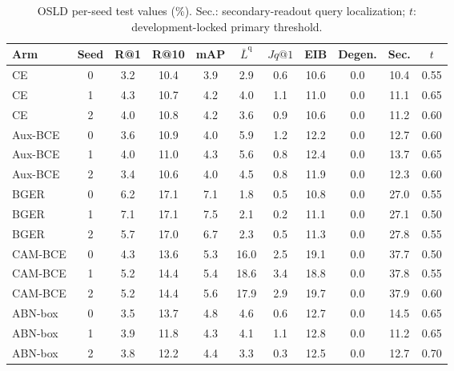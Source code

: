 \begin{table}[t]
\centering\footnotesize
\caption{OSLD per-seed test values (\%). Sec.: secondary-readout query localization; $t$: development-locked primary threshold.}
\label{tab:osld-perseed}
\begin{tabular}{lcccccccccc}
\toprule
Arm & Seed & R@1 & R@10 & mAP & $\bar L^{\mathrm q}$ & $Jq@1$ & EIB & Degen. & Sec. & $t$\\
\midrule
CE & 0 & 3.2 & 10.4 & 3.9 & 2.9 & 0.6 & 10.6 & 0.0 & 10.4 & 0.55\\
CE & 1 & 4.3 & 10.7 & 4.2 & 4.0 & 1.1 & 11.0 & 0.0 & 11.1 & 0.65\\
CE & 2 & 4.0 & 10.8 & 4.2 & 3.6 & 0.9 & 10.6 & 0.0 & 11.2 & 0.60\\
Aux-BCE & 0 & 3.6 & 10.9 & 4.0 & 5.9 & 1.2 & 12.2 & 0.0 & 12.7 & 0.60\\
Aux-BCE & 1 & 4.0 & 11.0 & 4.3 & 5.6 & 0.8 & 12.4 & 0.0 & 13.7 & 0.65\\
Aux-BCE & 2 & 3.4 & 10.6 & 4.0 & 4.5 & 0.8 & 11.9 & 0.0 & 12.3 & 0.60\\
BGER & 0 & 6.2 & 17.1 & 7.1 & 1.8 & 0.5 & 10.8 & 0.0 & 27.0 & 0.55\\
BGER & 1 & 7.1 & 17.1 & 7.5 & 2.1 & 0.2 & 11.1 & 0.0 & 27.1 & 0.50\\
BGER & 2 & 5.7 & 17.0 & 6.7 & 2.3 & 0.5 & 11.3 & 0.0 & 27.8 & 0.55\\
CAM-BCE & 0 & 4.3 & 13.6 & 5.3 & 16.0 & 2.5 & 19.1 & 0.0 & 37.7 & 0.50\\
CAM-BCE & 1 & 5.2 & 14.4 & 5.4 & 18.6 & 3.4 & 18.8 & 0.0 & 37.8 & 0.55\\
CAM-BCE & 2 & 5.2 & 14.4 & 5.6 & 17.9 & 2.9 & 19.7 & 0.0 & 37.9 & 0.60\\
ABN-box & 0 & 3.5 & 13.7 & 4.8 & 4.6 & 0.6 & 12.7 & 0.0 & 14.5 & 0.65\\
ABN-box & 1 & 3.9 & 11.8 & 4.3 & 4.1 & 1.1 & 12.8 & 0.0 & 11.2 & 0.65\\
ABN-box & 2 & 3.8 & 12.2 & 4.4 & 3.3 & 0.3 & 12.5 & 0.0 & 12.7 & 0.70\\
\bottomrule
\end{tabular}
\end{table}
